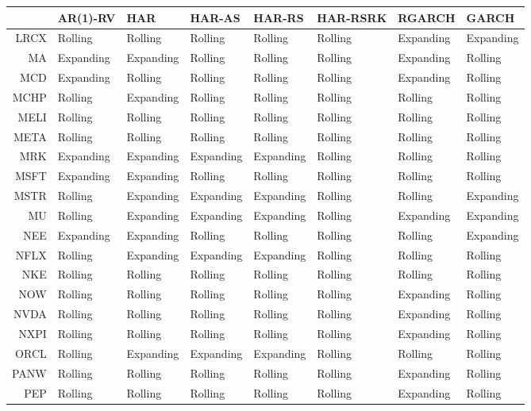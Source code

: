 \begin{table}[ht]
\centering
\begin{tabular}{rlllllll}
  \hline
 & AR(1)-RV & HAR & HAR-AS & HAR-RS & HAR-RSRK & RGARCH & GARCH \\ 
  \hline
LRCX & Rolling & Rolling & Rolling & Rolling & Rolling & Expanding & Expanding \\ 
  MA & Expanding & Expanding & Rolling & Rolling & Rolling & Expanding & Rolling \\ 
  MCD & Expanding & Rolling & Rolling & Rolling & Rolling & Expanding & Rolling \\ 
  MCHP & Rolling & Expanding & Rolling & Rolling & Rolling & Rolling & Rolling \\ 
  MELI & Rolling & Rolling & Rolling & Rolling & Rolling & Rolling & Rolling \\ 
  META & Rolling & Rolling & Rolling & Rolling & Rolling & Rolling & Rolling \\ 
  MRK & Expanding & Expanding & Expanding & Expanding & Rolling & Rolling & Rolling \\ 
  MSFT & Expanding & Expanding & Rolling & Rolling & Rolling & Rolling & Rolling \\ 
  MSTR & Rolling & Expanding & Expanding & Expanding & Rolling & Rolling & Expanding \\ 
  MU & Rolling & Expanding & Expanding & Expanding & Rolling & Expanding & Expanding \\ 
  NEE & Expanding & Expanding & Rolling & Rolling & Rolling & Rolling & Expanding \\ 
  NFLX & Rolling & Expanding & Expanding & Expanding & Rolling & Rolling & Rolling \\ 
  NKE & Rolling & Rolling & Rolling & Rolling & Rolling & Rolling & Rolling \\ 
  NOW & Rolling & Rolling & Rolling & Rolling & Rolling & Expanding & Rolling \\ 
  NVDA & Rolling & Rolling & Rolling & Rolling & Rolling & Expanding & Rolling \\ 
  NXPI & Rolling & Rolling & Rolling & Rolling & Rolling & Expanding & Rolling \\ 
  ORCL & Rolling & Expanding & Expanding & Expanding & Rolling & Rolling & Rolling \\ 
  PANW & Rolling & Rolling & Rolling & Rolling & Rolling & Expanding & Rolling \\ 
  PEP & Rolling & Rolling & Rolling & Rolling & Rolling & Expanding & Rolling \\ 

\end{tabular}
\end{table}
